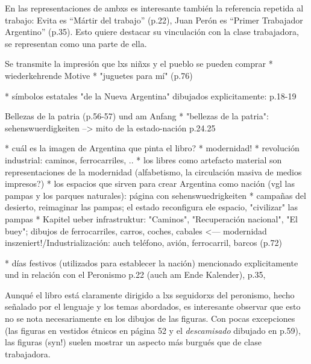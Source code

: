 En las representaciones de ambxs es interesante también la referencia repetida al trabajo:
Evita es ``Mártir del trabajo'' (p.22),
Juan Perón es ``Primer Trabajador Argentino'' (p.35).
Esto quiere destacar su vinculación con la clase trabajadora, se representan como una parte de ella.

Se transmite la impresión que lxs niñxs y el pueblo se pueden comprar
* wiederkehrende Motive
  * "juguetes para mí" (p.76)

* símbolos estatales "de la Nueva Argentina" dibujados explicitamente: p.18-19

Bellezas de la patria (p.56-57) und am Anfang
  * "bellezas de la patria": sehenswuerdigkeiten --> mito de la estado-nación p.24.25

* cuál es la imagen de Argentina que pinta el libro?
  * modernidad!
    * revolución industrial: caminos, ferrocarriles, ..
    * los libres como artefacto material son representaciones de la modernidad (alfabetismo, la circulación masiva de medios impresos?)
  * los espacios que sirven para crear Argentina como nación (vgl las pampas y los parques naturales): página con sehenswuedrigkeiten
    * campañas del desierto, reimaginar las pampas; el estado reconfigura ele espacio, "civilizar" las pampas
* Kapitel ueber infrastruktur: "Caminos", "Recuperación nacional", "El buey"; dibujos de ferrocarriles, carros, coches, cabales <--- modernidad inszeniert!/Industrialización: auch teléfono, avión, ferrocarril, barcos (p.72)

* días festivos (utilizados para establecer la nación) mencionado explicitamente und in relación con el Peronismo p.22 (auch am Ende Kalender), p.35, 


Aunqué el libro está claramente dirigido a lxs seguidorxs del peronismo,
hecho señalado por el lenguaje y los temas abordados,
es interesante observar que esto no se nota necesariamente en los dibujos de las figuras.
Con pocas excepciones (las figuras en vestidos étnicos en página 52 y el \textit{descamisado} dibujado en p.59),
las figuras (syn!) suelen mostrar un aspecto más burgués que de clase trabajadora.


\begin{comment}

* "Policlínico Evita" (p.43), "Fundación Eva Perón"(p.43), "clubes infantiles Evita" (donde se practica futbol^^)(p.55)
* se rescatan los éxitos (el voto femenino, el pago de las deudas,...)

* p.10: oraciones, rezar, catolicismo; pero también aquí "nunca olvido a Eva Perón, nuestra Madre Espiritual"
  * gottesgleichheit (hat anscheinend die kirche etwas verstoert^^ -- Chamosa o FF?)
  * kann alle wuensche verwirklichen
\end{comment}
